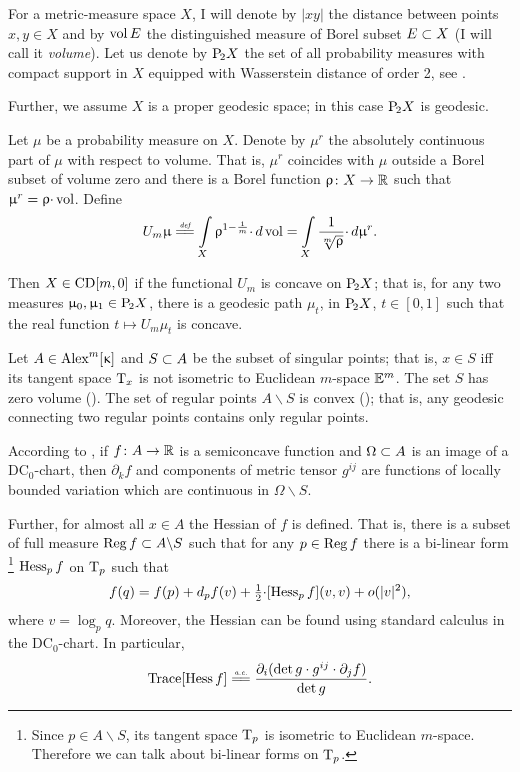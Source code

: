 \documentclass[oneside,a4paper]{article}
\begin{document}
For a metric-measure space $X$, 
I will denote 
by $|x y|$ the distance between points $x,y\in X$
and by $\mathop{\rm vol}\nolimits E$ the distinguished measure of Borel subset $E\subset X$ (I will call it \emph{volume}).
Let us denote by $\mathrm {P}_{\!2} X$ the set of all probability measures with compact support in $X$ equipped with Wasserstein distance of order 2, see \cite[6.1]{villani}.

Further, we assume $X$ is a proper geodesic space;
in this case $\mathrm {P}_{\!2} X$ is geodesic.

Let $\mu$ be a probability measure on $X$.
Denote by $\mu^{r}$ the absolutely continuous part of $\mu$ with respect to volume.
That is, 
$\mu^{r}$ coincides with $\mu$ outside a Borel subset of volume zero and
 there is a Borel function $\upvarrho\colon X\to\mathbb{R}$ such that $\mu^{r}\z=\rho{\cdot}\vol$.
Define
$$U_m\mu
\df
\int\limits_X\rho^{1-\frac1m}{\cdot}\, d\vol
=
\int\limits_X\frac1{\sqrt[m]{\rho}}{\cdot}\,d\mu^r.$$

Then $X\in \CD m0$ if the functional $U_m$ is concave on  $\mathrm {P}_{\!2} X$;
that is, for any two measures $\upmu_0,\upmu_1\in \mathrm {P}_{\!2} X$,
there is a geodesic path $\mu_t$, in $\mathrm {P}_{\!2} X$, $t\in[0,1]$ such that the real function $t\mapsto U_m\mu_t$ is concave.



Let $A\in\CBB m\kappa$ and $S\subset A$ be the subset of singular points;
that is, $x\in S$ iff its tangent space $\text{\rm T}_x$ is not isometric to Euclidean $m$-space $\mathbb{E}^m$. 
The set $S$ has zero volume (\cite[10.6]{BGP}).
The set of regular points $A\backslash S$ is convex (\cite{petrunin:parallel}); 
that is, any geodesic connecting two regular points contains only regular points.

According to \cite{perelman:DC},  
if $f\colon A\to\mathbb{R}$ is a semiconcave function 
and $\Omega\subset A$ is an image of a $\mathrm{DC}_0$-chart,
then
$\partial_k f$ and components of metric tensor $g^{i j}$ are functions of locally bounded variation which are continuous in $\Omega\backslash S$.

Further, for almost all $x\in A$ the Hessian of $f$ is defined.
That is, there is a subset of full measure $\mathop{\rm Reg}\nolimits f\subset A\backslash S$ such that for any $p\in \mathop{\rm Reg}\nolimits f$ there is a bi-linear form%
\footnote{Since $p\in A\backslash S$, its tangent space $\text{\rm T}_p$ is isometric to Euclidean $m$-space. Therefore we can talk about bi-linear forms on $\text{\rm T}_p$.}
 $\operatorname{Hess}_p f$ on $\text{\rm T}_p$ such that 
$$f(q)=f(p)+d_p f(v)+\tfrac12{\cdot}[\operatorname{Hess}_p f](v,v)+o(|v|^2),$$
where $v=\log_p q$.
Moreover, the Hessian can be found using standard calculus in the $\mathrm{DC}_0$-chart.
In particular,
$$\Trace[\Hess f]
\ae
\frac{\partial_i(\det g\cdot g^{i j}\cdot\partial_j f)}{\det g}.$$
\end{document}
